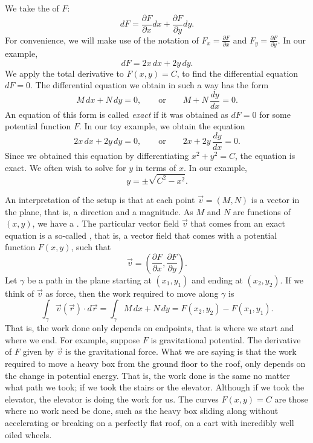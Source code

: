 \documentclass[12pt]{book}
\begin{document}
We take the
\emph{} of
$F$:
\begin{equation*}
dF = \frac{\partial F}{\partial x} dx + \frac{\partial F}{\partial y} dy .
\end{equation*}
For convenience,
we will make use of the notation of
$F_x = \frac{\partial F}{\partial x}$ and
$F_y = \frac{\partial F}{\partial y}$.
In our example,
\begin{equation*}
dF = 2x \, dx + 2y \, dy .
\end{equation*}
We apply the total derivative to $F(x,y) = C$, to find
the differential equation $dF = 0$.  The differential equation we obtain in such a way
has the form
\begin{equation*}
M \, dx + N \, dy = 0, \qquad
\text{or} \qquad
M + N \, \frac{dy}{dx} = 0 .
\end{equation*}
An equation of this form
is called \emph{exact} if it was obtained as $dF = 0$ for some potential
function $F$.
In our toy example, we obtain the equation
\begin{equation*}
2x \, dx + 2y \, dy = 0, \qquad
\text{or} \qquad
2x + 2y \, \frac{dy}{dx} = 0 .
\end{equation*}
Since we obtained this equation by differentiating $x^2+y^2=C$, 
the equation is exact.
We often wish to solve for $y$ in terms of $x$.  In our example,
\begin{equation*}
y = \pm \sqrt{C^2-x^2} .
\end{equation*}

An interpretation of the setup is that at each point $\vec{v} = (M,N)$ is
a vector in the plane, that is, a direction and a magnitude.
As $M$ and $N$ are functions of $(x,y)$, we have a \emph{}.  The particular 
vector field $\vec{v}$ that comes from an exact equation is a so-called
\emph{}, that is, a vector field that comes with a
potential function $F(x,y)$, such that
\begin{equation*}
\vec{v} = \left( \frac{\partial F}{\partial x} ,\frac{\partial F}{\partial
y} \right) .
\end{equation*}
Let
$\gamma$ be a path in the plane starting at $(x_1,y_1)$ and ending at
$(x_2,y_2)$.
If we think of $\vec{v}$ as force, then the work required to
move along $\gamma$ is
\begin{equation*}
\int_\gamma \vec{v}(\vec{r}) \cdot d\vec{r}
=
\int_\gamma M \, dx + N \, dy
=
F(x_2,y_2) - F(x_1,y_1) .
\end{equation*}
That is, the work done only depends on endpoints, that is where we start and
where we end.   For example, suppose $F$ is gravitational potential.  The
derivative of $F$ given by $\vec{v}$ is the gravitational force.
What we
are saying is that the work required to move a heavy box from the ground
floor to the roof, only depends on the change in potential energy.  That is,
the work done is the same
no matter what path we took; if we took the stairs or the elevator.
Although if we took the elevator, the elevator is doing the work for us.
The curves $F(x,y) = C$ are those where no work need be done, such as
the heavy box sliding along without accelerating or breaking on a perfectly
flat roof, on a cart with incredibly well oiled wheels.
\end{document}
